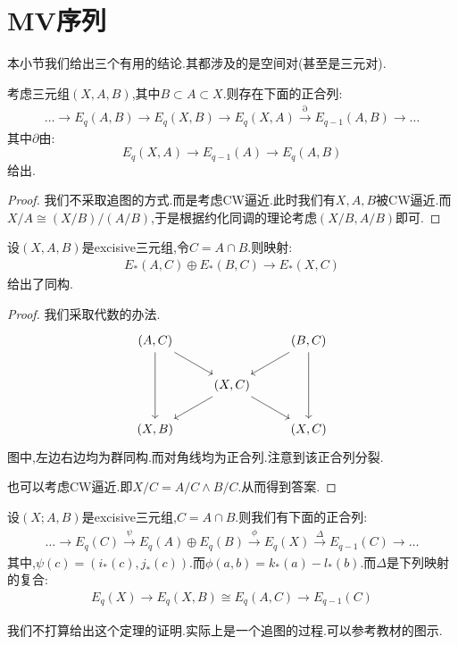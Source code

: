 \section{MV序列}
本小节我们给出三个有用的结论.其都涉及的是空间对(甚至是三元对).
\begin{theorem}[辫引理]
    考虑三元组$(X,A,B)$,其中$B \subset A \subset X$.则存在下面的正合列:
    \begin{align*}
        \dots \rightarrow E_q(A,B)\rightarrow E_q(X,B)\rightarrow E_q(X,A) \stackrel{\partial}{\rightarrow} E_{q-1}(A,B) \to \dots
    \end{align*}
    其中$\partial$由:
    $$
    E_q(X,A) \to E_{q-1}(A) \to E_q(A,B)
    $$
    给出.
\end{theorem}
\begin{proof}
    我们不采取追图的方式.而是考虑CW逼近.此时我们有$X,A,B$被CW逼近.而$X/A \cong (X/B)/(A/B)$,于是根据约化同调的理论考虑$(X/B,A/B)$即可.
\end{proof}
\begin{theorem}
    设$(X,A,B)$是excisive三元组,令$C=A\cap B$.则映射:
    \begin{align*}
        E_*(A,C)\oplus E_*(B,C) \to E_*(X,C)
    \end{align*}
    给出了同构.
\end{theorem}
\begin{proof}
    我们采取代数的办法.
    \[\begin{tikzcd}
	{(A,C)} && {(B,C)} \\
	& {(X,C)} \\
	{(X,B)} && {(X,C)}
	\arrow[from=1-1, to=3-1]
	\arrow[from=1-1, to=2-2]
	\arrow[from=2-2, to=3-1]
	\arrow[from=1-3, to=2-2]
	\arrow[from=2-2, to=3-3]
	\arrow[from=1-3, to=3-3]
\end{tikzcd}
    \]
    图中,左边右边均为群同构.而对角线均为正合列.注意到该正合列分裂.

也可以考虑CW逼近.即$X/C=A/C \wedge B/C$.从而得到答案.
\end{proof}
\begin{theorem}
    设$(X;A,B)$是excisive三元组,$C=A\cap B$.则我们有下面的正合列:
    \begin{align*}
        \dots \longrightarrow E_q(C) \stackrel{\psi}{\longrightarrow}E_q(A)\oplus E_q(B) \stackrel{\phi}{\longrightarrow} E_q(X) \stackrel{\Delta}{\longrightarrow} E_{q-1}(C) \longrightarrow \dots
    \end{align*}
    其中,$\psi(c)=(i_*(c),j_*(c))$.而$\phi(a,b)=k_*(a)-l_*(b)$.而$\Delta$是下列映射的复合:
    \begin{align*}
        E_q(X)\to E_q(X,B)\cong E_q(A,C) \to E_{q-1}(C)
    \end{align*}
\end{theorem}
我们不打算给出这个定理的证明.实际上是一个追图的过程.可以参考教材的图示.

